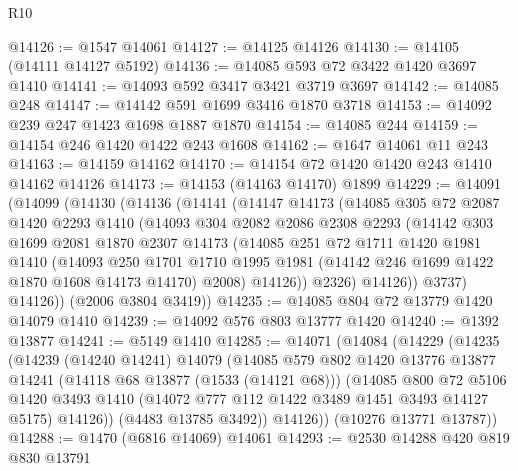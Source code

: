 \begin{lexlean}{R10}
\begin{coremodule}
@14126 := @1547 @14061
@14127 := @14125 @14126
@14130 := @14105 (@14111 @14127 @5192)
@14136 := @14085 @593 @72 @3422 @1420 @3697 @1410
@14141 := @14093 @592 @3417 @3421 @3719 @3697
@14142 := @14085 @248
@14147 := @14142 @591 @1699 @3416 @1870 @3718
@14153 := @14092 @239 @247 @1423 @1698 @1887 @1870
@14154 := @14085 @244
@14159 := @14154 @246 @1420 @1422 @243 @1608
@14162 := @1647 @14061 @11 @243
@14163 := @14159 @14162
@14170 := @14154 @72 @1420 @1420 @243 @1410 @14162 @14126
@14173 := @14153 (@14163 @14170) @1899
@14229 := @14091
    (@14099
      (@14130
        (@14136
          (@14141
            (@14147
              @14173
              (@14085
                @305
                @72
                @2087
                @1420
                @2293
                @1410
                (@14093
                  @304
                  @2082
                  @2086
                  @2308
                  @2293
                  (@14142
                    @303
                    @1699
                    @2081
                    @1870
                    @2307
                    @14173
                    (@14085
                      @251
                      @72
                      @1711
                      @1420
                      @1981
                      @1410
                      (@14093
                        @250
                        @1701
                        @1710
                        @1995
                        @1981
                        (@14142 @246 @1699 @1422 @1870 @1608 @14173 @14170)
                        @2008)
                      @14126))
                  @2326)
                @14126))
            @3737)
          @14126))
      (@2006 @3804 @3419))
@14235 := @14085 @804 @72 @13779 @1420 @14079 @1410
@14239 := @14092 @576 @803 @13777 @1420
@14240 := @1392 @13877
@14241 := @5149 @1410
@14285 := @14071
    (@14084
      (@14229
        (@14235
          (@14239
            (@14240 @14241)
            @14079
            (@14085
              @579
              @802
              @1420
              @13776
              @13877
              @14241
              (@14118 @68 @13877 (@1533 (@14121 @68)))
              (@14085
                @800
                @72
                @5106
                @1420
                @3493
                @1410
                (@14072 @777 @112 @1422 @3489 @1451 @3493 @14127 @5175)
                @14126))
            (@4483 @13785 @3492))
          @14126))
      (@10276 @13771 @13787))
@14288 := @1470 (@6816 @14069) @14061
@14293 := @2530 @14288 @420 @819 @830 @13791

\end{coremodule}
\end{lexlean}
